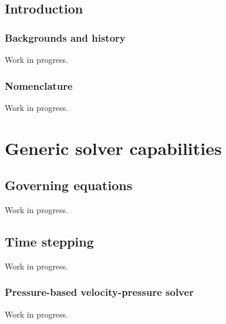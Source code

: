 \documentclass[a4paper,10pt,twoside]{csdoc}
\newcounter{prog}[part]
\begin{document}
\def\contentsname{\textbf{\normalsize Table of contents}\pdfbookmark[1]{Contents}{contents}}
\def\indexname{Index des variables principales et des mots cl\'es}

\large
\makepdgCS
\normalsize

\passepage


\passepart
\begin{center}\begin{singlespace}
\tableofcontents
\end{singlespace}\end{center}


%
%
\passepage

%
\chapter{Introduction}
\section{Backgrounds and history}
Work in progress.
\section{Nomenclature}
Work in progress.

\part{Generic solver capabilities}
\setcounter{chapter}{0}
\setcounter{section}{0}
\setcounter{equation}{0}
\setcounter{figure}{0}

\chapter{Governing equations}
Work in progress.
\chapter{Time stepping}
Work in progress.
\section{Pressure-based velocity-pressure solver}
Work in progress.
\end{document}
